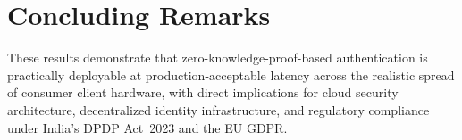 \documentclass[12pt,a4paper,oneside]{report}
\begin{document}
\section{Concluding Remarks}

These results demonstrate that zero-knowledge-proof-based authentication
is practically deployable at production-acceptable latency across the
realistic spread of consumer client hardware, with direct implications for
cloud security architecture, decentralized identity infrastructure, and
regulatory compliance under India's DPDP Act~2023 and the EU GDPR.

\clearpage
{}
\end{document}
